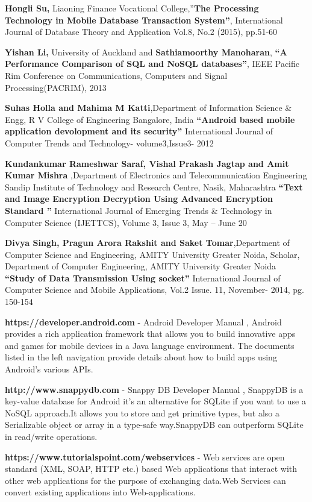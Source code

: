 \documentclass[12pt, a4paper]{article}
\begin{document}
\begin{enumerate}[label={[\arabic*]}]
 \item \textbf{Hongli Su,} Liaoning Finance Vocational College,”\textbf{The Processing Technology in Mobile Database Transaction System”},  International Journal of Database Theory and Application Vol.8, No.2 (2015), pp.51-60
\item \textbf{Yishan Li,} University of Auckland and \textbf{Sathiamoorthy Manoharan}, \textbf{“A Performance Comparison of SQL and NoSQL databases”}, IEEE Pacific Rim Conference on Communications, Computers and Signal Processing(PACRIM), 2013
\item \textbf{Suhas Holla and Mahima M Katti},Department of Information Science \& Engg, R V College of Engineering Bangalore, India
\textbf{“Android based mobile application devolopment and its security”}
 International Journal of Computer Trends and Technology- volume3,Issue3- 2012
 \item \textbf{Kundankumar Rameshwar Saraf, Vishal Prakash Jagtap and Amit Kumar Mishra },Department of Electronics and Telecommunication Engineering Sandip Institute of Technology and Research Centre, Nasik, Maharashtra
\textbf{“Text and Image Encryption Decryption Using Advanced Encryption Standard ”}
International Journal of Emerging Trends \& Technology in Computer Science (IJETTCS),
Volume 3, Issue 3, May – June 20
\item \textbf{Divya Singh, Pragun Arora Rakshit and Saket Tomar},Department of Computer Science and Engineering, AMITY University Greater Noida, Scholar, Department of Computer Engineering, AMITY University Greater Noida
\textbf{“Study of Data Transmission Using socket”}
 International Journal of Computer Science and Mobile Applications, Vol.2 Issue. 11, November- 2014, pg. 150-154
\item \textbf{https://developer.android.com} - Android Developer Manual ,  Android provides a rich application framework that allows you to build innovative apps and games for mobile devices in a Java language environment. The documents listed in the left navigation provide details about how to build apps using Android's various APIs.
\item \textbf{http://www.snappydb.com} - Snappy DB Developer Manual , SnappyDB is a key-value database for Android it's an alternative for SQLite if you want to use a NoSQL approach.It allows you to store and get primitive types, but also a Serializable object or array in a type-safe way.SnappyDB can outperform SQLite in read/write operations.
\item \textbf{https://www.tutorialspoint.com/webservices} - Web services are open standard (XML, SOAP, HTTP etc.) based Web applications that interact with other web applications for the purpose of exchanging data.Web Services can convert existing applications into Web-applications.
\end{enumerate}
\end{document}
